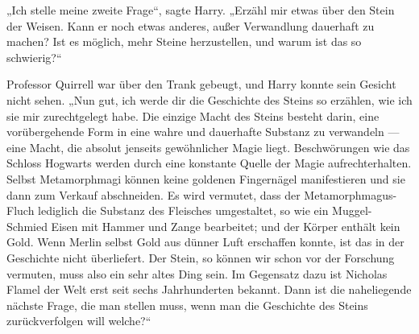 „Ich stelle meine zweite Frage“, sagte Harry.
„Erzähl mir etwas über den Stein der Weisen. Kann er noch etwas anderes, außer Verwandlung dauerhaft zu machen? Ist es möglich, mehr Steine herzustellen, und warum ist das so schwierig?“

Professor Quirrell war über den Trank gebeugt, und Harry konnte sein Gesicht nicht sehen.
„Nun gut, ich werde dir die Geschichte des Steins so erzählen, wie ich sie mir zurechtgelegt habe. Die einzige Macht des Steins besteht darin, eine vorübergehende Form in eine wahre und dauerhafte Substanz zu verwandeln — eine Macht, die absolut jenseits gewöhnlicher Magie liegt. Beschwörungen wie das Schloss Hogwarts werden durch eine konstante Quelle der Magie aufrechterhalten. Selbst Metamorphmagi können keine goldenen Fingernägel manifestieren und sie dann zum Verkauf abschneiden. Es wird vermutet, dass der Metamorphmagus-Fluch lediglich die Substanz des Fleisches umgestaltet, so wie ein Muggel-Schmied Eisen mit Hammer und Zange bearbeitet; und der Körper enthält kein Gold. Wenn Merlin selbst Gold aus dünner Luft erschaffen konnte, ist das in der Geschichte nicht überliefert. Der Stein, so können wir schon vor der Forschung vermuten, muss also ein sehr altes Ding sein. Im Gegensatz dazu ist Nicholas Flamel der Welt erst seit sechs Jahrhunderten bekannt. Dann ist die naheliegende nächste Frage, die man stellen muss, wenn man die Geschichte des Steins zurückverfolgen will welche?“

